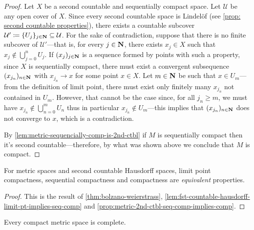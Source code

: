 \begin{proof}
    Let \(X\) be a second countable and sequentially compact space. Let
    \(\mathcal{U}\) be any open cover of \(X\). Since every second countable space
    is Lindel\"{o}f (see \cref{prop: second countable properties}), there exists a
    countable subcover
    \(\mathcal{U}' \coloneq \{U_j\}_{j \in \mathbf{N}} \subseteq \mathcal{U}\). For the sake
    of contradiction, suppose that there is no finite subcover of \(\mathcal{U}'\)---that is, for every \(j \in \mathbf{N}\), there exists \(x_j \in X\) such that
    \(x_j \notin \bigcup_{j=0}^n U_j\). If \((x_j)_{j \in \mathbf{N}}\) is a sequence formed
    by points with such a property, since \(X\) is sequentially compact, there must
    exist a convergent subsequence \((x_{j_n})_{n \in \mathbf{N}}\) with \(x_{j_n} \to x\)
    for some point \(x \in X\). Let \(m \in \mathbf{N}\) be such that \(x \in U_m\)---from
    the definition of limit point, there must exist only finitely many \(x_{j_n}\)
    not contained in \(U_m\). However, that cannot be the case since, for all
    \(j_n \geq m\), we must have \(x_{j_n} \notin \bigcup_{n=0}^m U_{n}\) thus in
    particular \(x_{j_n} \notin U_m\)---this implies that \((x_{j_n})_{n \in \mathbf{N}}\)
    does not converge to \(x\), which is a contradiction.

    By \cref{lem:metric-sequencially-comp-is-2nd-ctbl} if \(M\) is sequentially
    compact then it's second countable---therefore, by what was shown above we
    conclude that \(M\) is compact.
\end{proof}

\begin{theorem}
    \label{thm:metric-2d-ctbl-hausdorff-equiv-compactness}
    For metric spaces and second countable Hausdorff spaces, limit point
    compactness, sequential compactness and compactness are \emph{equivalent}
    properties.
\end{theorem}

\begin{proof}
    This is the result of \cref{thm:bolzano-weierstrass},
    \cref{lem:fst-countable-hausdorff-limit-pt-implies-seq-comp} and
    \cref{prop:metric-2nd-ctbl-seq-comp-implies-comp}.
\end{proof}

\begin{corollary}
    \label{cor:compact-metric-space-is-complete}
    Every compact metric space is complete.
\end{corollary}

